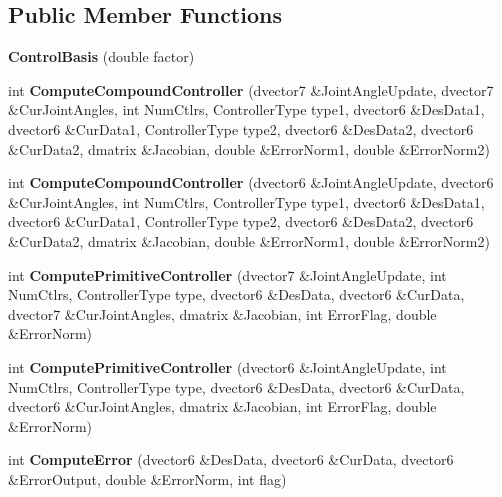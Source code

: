 \subsection*{Public Member Functions}
\begin{DoxyCompactItemize}
\item 
\hypertarget{classControlBasis_a1a5b119b00276a2612b3d5c142d7cc03}{{\bfseries Control\-Basis} (double factor)}\label{classControlBasis_a1a5b119b00276a2612b3d5c142d7cc03}

\item 
\hypertarget{classControlBasis_af29f2072a39583fb9abf85f7c53e538d}{int {\bfseries Compute\-Compound\-Controller} (dvector7 \&Joint\-Angle\-Update, dvector7 \&Cur\-Joint\-Angles, int Num\-Ctlrs, Controller\-Type type1, dvector6 \&Des\-Data1, dvector6 \&Cur\-Data1, Controller\-Type type2, dvector6 \&Des\-Data2, dvector6 \&Cur\-Data2, dmatrix \&Jacobian, double \&Error\-Norm1, double \&Error\-Norm2)}\label{classControlBasis_af29f2072a39583fb9abf85f7c53e538d}

\item 
\hypertarget{classControlBasis_a2eed9f14815a6ca7e231d1ff47f0334e}{int {\bfseries Compute\-Compound\-Controller} (dvector6 \&Joint\-Angle\-Update, dvector6 \&Cur\-Joint\-Angles, int Num\-Ctlrs, Controller\-Type type1, dvector6 \&Des\-Data1, dvector6 \&Cur\-Data1, Controller\-Type type2, dvector6 \&Des\-Data2, dvector6 \&Cur\-Data2, dmatrix \&Jacobian, double \&Error\-Norm1, double \&Error\-Norm2)}\label{classControlBasis_a2eed9f14815a6ca7e231d1ff47f0334e}

\item 
\hypertarget{classControlBasis_a4b180caace3e55cef4c8b9ac666f049d}{int {\bfseries Compute\-Primitive\-Controller} (dvector7 \&Joint\-Angle\-Update, int Num\-Ctlrs, Controller\-Type type, dvector6 \&Des\-Data, dvector6 \&Cur\-Data, dvector7 \&Cur\-Joint\-Angles, dmatrix \&Jacobian, int Error\-Flag, double \&Error\-Norm)}\label{classControlBasis_a4b180caace3e55cef4c8b9ac666f049d}

\item 
\hypertarget{classControlBasis_aa38fe4df0f25492acf406008f5ee89d3}{int {\bfseries Compute\-Primitive\-Controller} (dvector6 \&Joint\-Angle\-Update, int Num\-Ctlrs, Controller\-Type type, dvector6 \&Des\-Data, dvector6 \&Cur\-Data, dvector6 \&Cur\-Joint\-Angles, dmatrix \&Jacobian, int Error\-Flag, double \&Error\-Norm)}\label{classControlBasis_aa38fe4df0f25492acf406008f5ee89d3}

\item 
\hypertarget{classControlBasis_a8f183df573701d25fe0a4c1d46cfe688}{int {\bfseries Compute\-Error} (dvector6 \&Des\-Data, dvector6 \&Cur\-Data, dvector6 \&Error\-Output, double \&Error\-Norm, int flag)}\label{classControlBasis_a8f183df573701d25fe0a4c1d46cfe688}


\end{DoxyCompactItemize}
